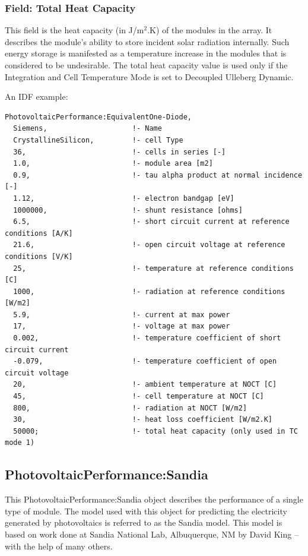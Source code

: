 \subsubsection{Field: Total Heat Capacity}\label{field-total-heat-capacity}

This field is the heat capacity (in J/m\(^{2}\).K) of the modules in the array. It describes the module's ability to store incident solar radiation internally. Such energy storage is manifested as a temperature increase in the modules that is considered to be undesirable. The total heat capacity value is used only if the Integration and Cell Temperature Mode is set to Decoupled Ulleberg Dynamic.

An IDF example:

\begin{lstlisting}
PhotovoltaicPerformance:EquivalentOne-Diode,
  Siemens,                    !- Name
  CrystallineSilicon,         !- cell Type
  36,                         !- cells in series [-]
  1.0,                        !- module area [m2]
  0.9,                        !- tau alpha product at normal incidence [-]
  1.12,                       !- electron bandgap [eV]
  1000000,                    !- shunt resistance [ohms]
  6.5,                        !- short circuit current at reference conditions [A/K]
  21.6,                       !- open circuit voltage at reference conditions [V/K]
  25,                         !- temperature at reference conditions [C]
  1000,                       !- radiation at reference conditions [W/m2]
  5.9,                        !- current at max power
  17,                         !- voltage at max power
  0.002,                      !- temperature coefficient of short circuit current
  -0.079,                     !- temperature coefficient of open circuit voltage
  20,                         !- ambient temperature at NOCT [C]
  45,                         !- cell temperature at NOCT [C]
  800,                        !- radiation at NOCT [W/m2]
  30,                         !- heat loss coefficient [W/m2.K]
  50000;                      !- total heat capacity (only used in TC mode 1)
\end{lstlisting}

\subsection{PhotovoltaicPerformance:Sandia}\label{photovoltaicperformancesandia}

This PhotovoltaicPerformance:Sandia object describes the performance of a single type of module. The model used with this object for predicting the electricity generated by photovoltaics is referred to as the Sandia model. This model is based on work done at Sandia National Lab, Albuquerque, NM by David King -- with the help of many others.

